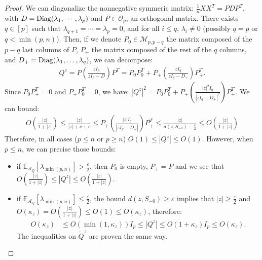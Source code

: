 \documentclass[a4papaer, titlepage]{book}
\begin{document}
\begin{proof}%
   We can diagonalize the nonnegative symmeric matrix: $\frac{1}{n}XX^T = P D P^T$, with $D = \operatorname{Diag}(\lambda_1,\cdots, \lambda_p)$ and $P \in \mathcal O_p$, an orthogonal matrix. There exists $q \in [p]$ such that $\lambda_{q+1} = \cdots = \lambda_{p} = 0$, and for all $i \leq q$, $\lambda_i \neq 0$ (possibly $q = p$ or $q < \min(p,n)$). Then, if we denote $P_0 \in \mathcal M_{p,{p-q}}$ the matrix composed of the $p-q$ last columns of $P$, $P_+$ the matrix composed of the rest of the $q$ columns, and $D_+ = \operatorname{Diag}(\lambda_{1}, \ldots, \lambda_q)$, we can decompose:
  \begin{align*}
     Q^z = P \left(\frac{zI_p}{zI_p - D}\right) P^T = P_0P_0^T + P_+ \left(\frac{zI_q}{zI_q - D_+} \right) P_+^T.
   \end{align*}
  Since $P_0P_+^T =0$ and $P_+P_0^T =0$, we have: $|Q^z|^2 = P_0P_0^T + P_+ \left(\frac{|z|^2I_q}{|zI_q - D_+|^2} \right) P_+^T$. We can bound:
   \begin{align*}
     O \left(\frac{|z|}{1+|z|}\right) \leq \frac{|z|}{|z| + \nu + \varepsilon} \leq P_+ \left(\frac{|z|I_q}{|zI_q - D_+|} \right) P_+^T 
        \leq  \frac{|z|}{d(z, S_{-0}) - \frac{\varepsilon}{2}} \leq O \left(\frac{|z|}{1+|z|}\right)
   \end{align*}
  Therefore, in all cases ($p \leq n$ or $p\geq n$) $O(1) \leq |Q^z| \leq O(1)$. However, when $p\leq n$, we can precise those bounds:
   \begin{itemize}
     \item if $\mathbb E_{\mathcal A_Q}[\lambda_{\min(p,n)}] > \frac{\varepsilon}{2}$, then $P_0$ is empty, $P_ + = P$ and we see that $ O \left(\frac{|z|}{1+|z|}\right) \leq |Q^z|\leq  O \left(\frac{|z|}{1+|z|}\right)$.
      \item if $\mathbb E_{\mathcal A_Q}[\lambda_{\min(p,n)}] \leq \frac{\varepsilon}{2}$, the bound $d(z, S_{-0}) \geq \varepsilon$ implies that $|z| \geq \frac{\varepsilon}{2}$ %
       and $ O(\kappa_z) = O(\frac{|z|}{1+|z|})\leq O(1) \leq O(\kappa_z)$, therefore:%
     \begin{align*}
       O \left(\kappa_z\right)%
       &\leq O \left(\min \left(1, \kappa_z\right)\right)I_p 
       \leq |Q^z|   \leq O \left(1 +\kappa_z\right) I_p
       \leq O \left(\kappa_z\right).
     \end{align*}
     The inequalities on $\check Q^z$ are proven the same way.
   \end{itemize}

\end{proof}
\end{document}

